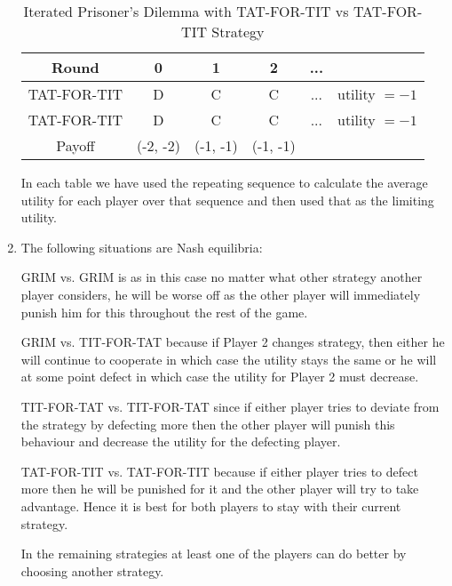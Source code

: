 \documentclass[a4paper]{article}
\begin{document}
\begin{exercise}{5}
\begin{enumerate}[label=(\alph*)]
\begin{table}[H]
\begin{tabular}{c c c c c c }
          \hline
          Round & 0 & 1 & 2 & ... & \\
          \hline
          TAT-FOR-TIT   & D        & C        & C        & ... & utility $ =-1 $\\
          TAT-FOR-TIT   & D        & C        & C        & ... & utility $ =-1 $\\
          Payoff        & (-2, -2) & (-1, -1) & (-1, -1) &  \\
          \hline
        \end{tabular}
        \caption{Iterated Prisoner's Dilemma with TAT-FOR-TIT vs TAT-FOR-TIT Strategy}
      \end{table}

      In each table we have used the repeating sequence to calculate the average utility for each player over that sequence and then used that as the limiting utility.

    \item The following situations are Nash equilibria:

      GRIM vs. GRIM is as in this case no matter what other strategy another player considers, he will be worse off as the other player will immediately punish him for this throughout the rest of the game.

      GRIM vs. TIT-FOR-TAT because if Player 2 changes strategy, then either he will continue to cooperate in which case the utility stays the same or he will at some point defect in which case the utility for Player 2 must decrease.

      TIT-FOR-TAT vs. TIT-FOR-TAT since if either player tries to deviate from the strategy by defecting more then the other player will punish this behaviour and decrease the utility for the defecting player.

      TAT-FOR-TIT vs. TAT-FOR-TIT because if either player tries to defect more then he will be punished for it and the other player will try to take advantage. Hence it is best for both players to stay with their current strategy.

      In the remaining strategies at least one of the players can do better by choosing another strategy.
  \end{enumerate}
\end{exercise}
\end{document}
